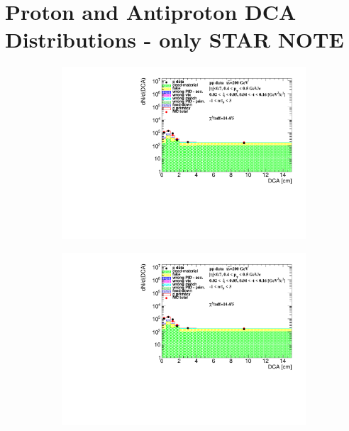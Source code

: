 \chapter[Proton and Antiproton DCA Distributions]{Proton and Antiproton DCA Distributions - only STAR NOTE}\label{appendix:DCA_proton}
\begin{figure}[h!]
	\centering
	\begin{subfigure}{.45\textwidth}
		\includegraphics[width=\linewidth, page=1]{chapters/chrgSTAR/img/DCAproton/background_p_0.pdf}
	\end{subfigure}
	\begin{subfigure}{.45\textwidth}
		\includegraphics[width=\linewidth, page=2]{chapters/chrgSTAR/img/DCAproton/background_p_0.pdf}
	\end{subfigure}
	\begin{subfigure}{.45\textwidth}

\end{subfigure}
\end{figure}
